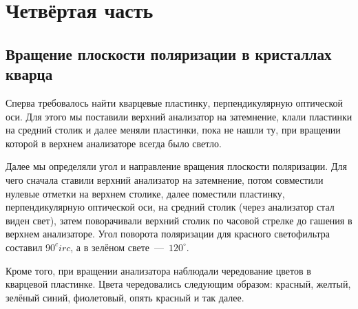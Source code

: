 \documentclass[12pt]{article}
\begin{document}
	\section{Четвёртая часть}
	\subsection{Вращение плоскости поляризации в кристаллах кварца}
	Сперва требовалось найти кварцевые пластинку, перпендикулярную оптической оси. Для этого мы поставили верхний анализатор на затемнение, клали пластинки на средний столик и далее меняли пластинки, пока не нашли ту, при вращении которой в верхнем анализаторе всегда было светло.
	\par Далее мы определяли угол и направление вращения плоскости поляризации. Для чего сначала ставили верхний анализатор на затемнение, потом совместили нулевые отметки на верхнем столике, далее поместили пластинку, перпендикулярную оптической оси, на средний столик (через анализатор стал виден свет), затем поворачивали верхний столик по часовой стрелке до гашения в верхнем анализаторе. Угол поворота поляризации для красного светофильтра составил $90^circ$, а в зелёном свете~\----~$120^\circ$. 
	\par Кроме того, при вращении анализатора наблюдали чередование цветов в кварцевой пластинке. Цвета чередовались следующим образом: красный, желтый, зелёный синий, фиолетовый, опять красный и так далее.
\end{document}
